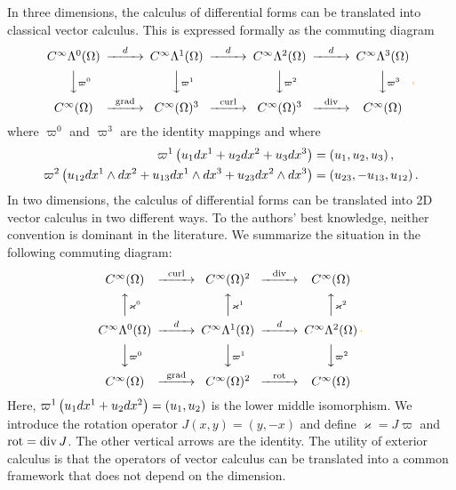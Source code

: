 \documentclass[10pt,letterpaper]{article}
\newcommand\cye[1]{%
\protect\leavevmode
\begingroup
    \color{red!35!yellow}%
    #1%
\endgroup
}
\begin{document}
\begin{remark}
    In three dimensions, 
    the calculus of differential forms can be translated into classical vector calculus. 
    This is expressed formally as the commuting diagram 
    \begin{gather*}
    \begin{CD}
        C^\infty\Alt^0(\Omega) @>{\cartan}>> C^\infty\Alt^1(\Omega) @>{\cartan}>> C^\infty\Alt^2(\Omega) @>{\cartan}>> C^\infty\Alt^3(\Omega) 
        \\
        @VV{\varpi^{0}}V 
        @VV{\varpi^{1}}V 
        @VV{\varpi^{2}}V 
        @VV{\varpi^{3}}V 
        \\
        C^\infty(\Omega) @>{\grad}>> C^\infty(\Omega)^{3} @>{\curl}>> C^\infty(\Omega)^{3} @>{\divergence}>> C^\infty(\Omega)
    \end{CD}
    \cye{\, ,}
    \end{gather*}
    where $\varpi^{0}$ and $\varpi^{3}$ are the identity mappings and where 
    \begin{align*}
     \varpi^{1}\left( u_1 dx^{1} + u_2 dx^{2} + u_3 dx^{3} \right) 
     &= 
     \left( u_1, u_2, u_3 \right), 
     \\
     \varpi^{2}\left( u_{12} dx^{1} \wedge dx^{2} + u_{13} dx^{1} \wedge dx^{3} + u_{23} dx^{2} \wedge dx^{3} \right) 
     &= 
     \left( u_{23}, - u_{13}, u_{12} \right).   
    \end{align*}
    In two dimensions, 
    the calculus of differential forms can be translated into 2D vector calculus in two different ways. 
    To the authors' best knowledge, neither convention is dominant in the literature.
    We summarize the situation in the following commuting diagram: 
    \begin{gather*} 
    \begin{CD}
        C^\infty(\Omega) @>{\curl}>> C^\infty(\Omega)^{2} @>{\divergence}>> C^\infty(\Omega)
        \\
        @AA{\varkappa^{0}}A 
        @AA{\varkappa^{1}}A 
        @AA{\varkappa^{2}}A 
        \\
        C^\infty\Alt^0(\Omega) @>{\cartan}>> C^\infty\Alt^1(\Omega) @>{\cartan}>> C^\infty\Alt^2(\Omega) 
        \\
        @VV{\varpi^{0}}V 
        @VV{\varpi^{1}}V 
        @VV{\varpi^{2}}V 
        \\
        C^\infty(\Omega) @>{\grad}>> C^\infty(\Omega)^{2} @>{\rot}>> C^\infty(\Omega)
    \end{CD}
    \cye{\,.}
    \end{gather*}
    Here, $\varpi^{1}\left( u_1 dx^{1} + u_2 dx^{2} \right) = \left( u_1, u_2 \right)$ is the lower middle isomorphism. We introduce the rotation operator $J(x,y) = (y,-x)$ and define $\varkappa = J \varpi$ and $\operatorname{rot} = \operatorname{div} J$.
    The other vertical arrows are the identity. 
    The utility of exterior calculus is that the operators of vector calculus can be translated into a common framework that does not depend on the dimension.
\end{remark}
\end{document}
